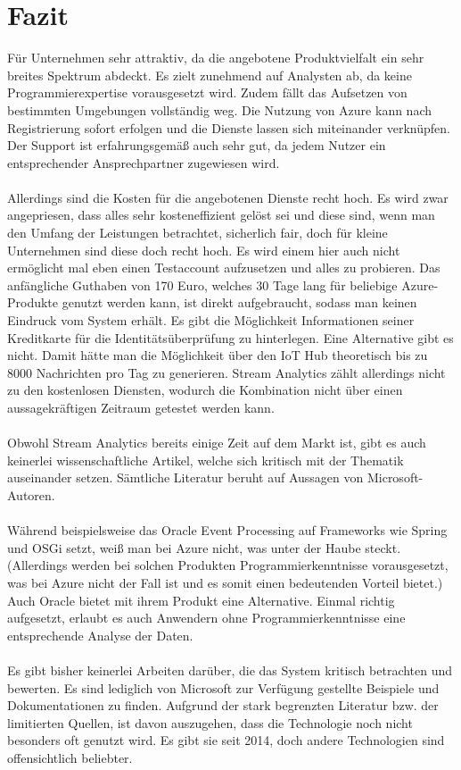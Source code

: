 \section{Fazit}
Für Unternehmen sehr attraktiv, da die angebotene Produktvielfalt ein sehr breites Spektrum abdeckt. Es zielt zunehmend auf Analysten ab, da keine Programmierexpertise vorausgesetzt wird. Zudem fällt das Aufsetzen von bestimmten Umgebungen vollständig weg. Die Nutzung von Azure kann nach Registrierung sofort erfolgen und die Dienste lassen sich miteinander verknüpfen. Der Support ist erfahrungsgemäß auch sehr gut, da jedem Nutzer ein entsprechender Ansprechpartner zugewiesen wird.\\ \\Allerdings sind die Kosten für die angebotenen Dienste recht hoch. Es wird zwar angepriesen, dass alles sehr kosteneffizient gelöst sei und diese sind, wenn man den Umfang der Leistungen betrachtet, sicherlich fair, doch für kleine Unternehmen sind diese doch recht hoch. Es wird einem hier auch nicht ermöglicht mal eben einen Testaccount aufzusetzen und alles zu probieren. Das anfängliche Guthaben von 170 Euro, welches 30 Tage lang für beliebige Azure-Produkte genutzt werden kann, ist direkt aufgebraucht, sodass man keinen Eindruck vom System erhält. Es gibt die Möglichkeit Informationen seiner Kreditkarte für die Identitätsüberprüfung zu hinterlegen. Eine Alternative gibt es nicht. Damit hätte man die Möglichkeit über den IoT Hub theoretisch bis zu 8000 Nachrichten pro Tag zu generieren. Stream Analytics zählt allerdings nicht zu den kostenlosen Diensten, wodurch die Kombination nicht über einen aussagekräftigen Zeitraum getestet werden kann.\\ \\ Obwohl Stream Analytics bereits einige Zeit auf dem Markt ist, gibt es auch keinerlei wissenschaftliche Artikel, welche sich kritisch mit der Thematik auseinander setzen. Sämtliche Literatur beruht auf Aussagen von Microsoft-Autoren.\\ \\Während beispielsweise das Oracle Event Processing auf Frameworks wie Spring und OSGi setzt, weiß man bei Azure nicht, was unter der Haube steckt. (Allerdings werden bei solchen Produkten Programmierkenntnisse vorausgesetzt, was bei Azure nicht der Fall ist und es somit einen bedeutenden Vorteil bietet.) Auch Oracle bietet mit ihrem Produkt eine Alternative. Einmal richtig aufgesetzt, erlaubt es auch Anwendern ohne Programmierkenntnisse eine entsprechende Analyse der Daten.\\ \\Es gibt bisher keinerlei Arbeiten darüber, die das System kritisch betrachten und bewerten. Es sind lediglich von Microsoft zur Verfügung gestellte Beispiele und Dokumentationen zu finden. Aufgrund der stark begrenzten Literatur bzw. der limitierten Quellen, ist davon auszugehen, dass die Technologie noch nicht besonders oft genutzt wird. Es gibt sie seit 2014, doch andere Technologien sind offensichtlich beliebter.



\ifCLASSOPTIONcaptionsoff
  \newpage
\fi